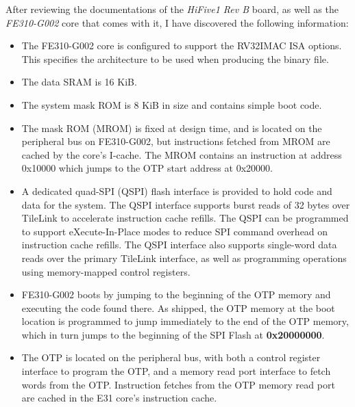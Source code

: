 After reviewing the documentations of the \textit{HiFive1 Rev B} board, as well as the \textit{FE310-G002} core that comes with it, I have discovered the following information:
\begin{itemize}
    \item The FE310-G002 core is configured to support the RV32IMAC ISA options. This specifies the architecture to be used when producing the binary file.\cite{hifive1RevBConfig}

    \item The data SRAM is 16 KiB.\cite{hifive1RevBConfig}

    \item The system mask ROM is 8 KiB in size and contains simple boot code.\cite{hifive1RevBConfig}

    \item The mask ROM (MROM) is fixed at design time, and is located on the peripheral bus on FE310-G002, but instructions fetched from MROM are cached by the core’s I-cache. The MROM contains an instruction at address 0x10000 which jumps to the OTP start address at 0x20000.\cite{fe310g002manBootProcess}

    \item A dedicated quad-SPI (QSPI) flash interface is provided to hold code and data for the system. The QSPI interface supports burst reads of 32 bytes over TileLink to accelerate instruction cache refills. The QSPI can be programmed to support eXecute-In-Place modes to reduce SPI command overhead on instruction cache refills. The QSPI interface also supports single-word data reads over the primary TileLink interface, as well as programming operations using memory-mapped control registers.\cite{hifive1RevBConfig}

    \item FE310-G002 boots by jumping to the beginning of the OTP memory and executing the code found there. As shipped, the OTP memory at the boot location is programmed to jump immediately to the end of the OTP memory, which in turn jumps to the beginning of the SPI Flash at \textbf{0x20000000}.\cite{hifive1RevBBootCode}

    \item The OTP is located on the peripheral bus, with both a control register interface to program the OTP, and a memory read port interface to fetch words from the OTP. Instruction fetches from the OTP memory read port are cached in the E31 core’s instruction cache.\cite{fe310g002manBootProcess}


\end{itemize}
